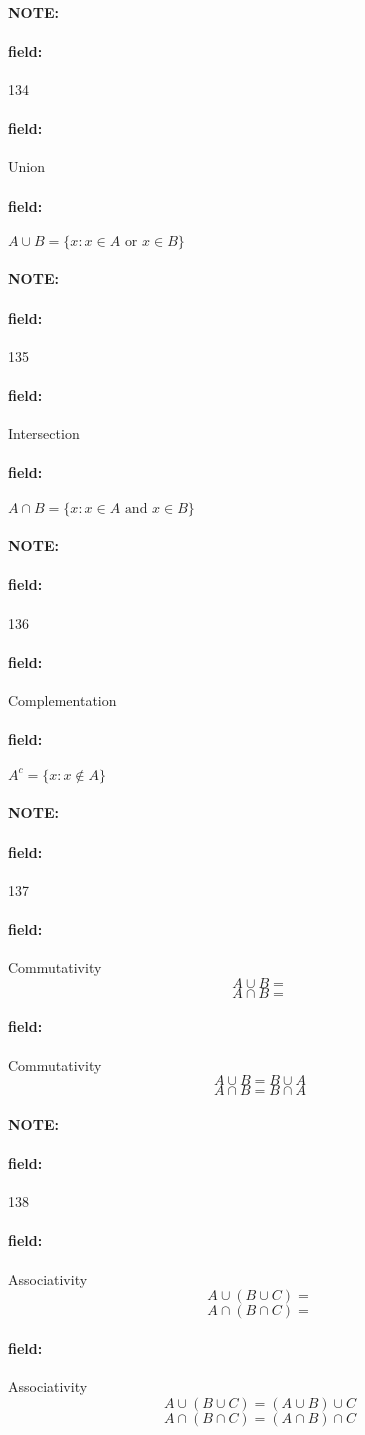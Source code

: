 \documentclass[12pt]{article}
\newenvironment{note}{\paragraph{NOTE:}}{}
\newenvironment{field}{\paragraph{field:}}{}
\begin{document}
\begin{note} \begin{field} \tiny 134 \end{field}
  \begin{field}
    Union
  \end{field}
  \begin{field}
    $ A \cup B = \{x:x \in A \text{ or } x \in B\}$
  \end{field}
\end{note}

\begin{note} \begin{field} \tiny 135 \end{field}
  \begin{field}
    Intersection
  \end{field}
  \begin{field}
    $A \cap B = \{x:x \in A \text{ and } x \in B\}$
  \end{field}
\end{note}

\begin{note} \begin{field} \tiny 136 \end{field}
  \begin{field}
    Complementation
  \end{field}
  \begin{field}
    $A^c = \{x:x\notin A\}$
  \end{field}
\end{note}

\begin{note} \begin{field} \tiny 137 \end{field}
  \begin{field}
    Commutativity
    $$ A \cup B = $$
    $$ A \cap B = $$
  \end{field}
  \begin{field}
    Commutativity
    $$ A \cup B = B \cup A$$
    $$ A \cap B = B \cap A$$
  \end{field}
\end{note}

\begin{note} \begin{field} \tiny 138 \end{field}
  \begin{field}
    Associativity
    $$ A \cup (B \cup C) = $$
    $$ A \cap (B \cap C) = $$
  \end{field}
    \begin{field}
      Associativity
        $$ A \cup (B \cup C) = (A \cup B) \cup C$$
        $$ A \cap (B \cap C) = (A \cap B) \cap C$$
    \end{field}
\end{note}
\end{document}

